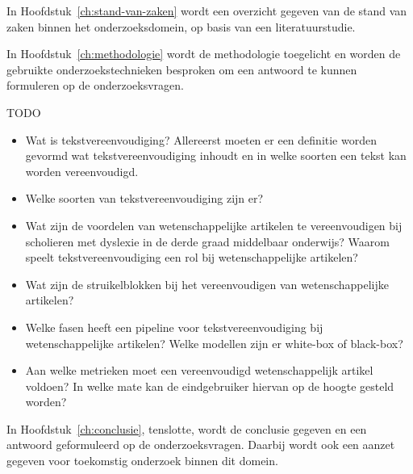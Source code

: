 In Hoofdstuk~\ref{ch:stand-van-zaken} wordt een overzicht gegeven van de stand van zaken binnen het onderzoeksdomein, op basis van een literatuurstudie.

In Hoofdstuk~\ref{ch:methodologie} wordt de methodologie toegelicht en worden de gebruikte onderzoekstechnieken besproken om een antwoord te kunnen formuleren op de onderzoeksvragen.


TODO
\begin{itemize}
	\item Wat is tekstvereenvoudiging? Allereerst moeten er een definitie worden gevormd wat tekstvereenvoudiging inhoudt en in welke soorten een tekst kan worden vereenvoudigd. 
	\item Welke soorten van tekstvereenvoudiging zijn er?
	\item Wat zijn de voordelen van wetenschappelijke artikelen te vereenvoudigen bij scholieren met dyslexie in de derde graad middelbaar onderwijs? Waarom speelt tekstvereenvoudiging een rol bij wetenschappelijke artikelen?
	\item Wat zijn de struikelblokken bij het vereenvoudigen van wetenschappelijke artikelen?
	\item Welke fasen heeft een pipeline voor tekstvereenvoudiging bij wetenschappelijke artikelen? Welke modellen zijn er white-box of black-box?
	\item Aan welke metrieken moet een vereenvoudigd wetenschappelijk artikel voldoen? In welke mate kan de eindgebruiker hiervan op de hoogte gesteld worden? 
\end{itemize}

In Hoofdstuk~\ref{ch:conclusie}, tenslotte, wordt de conclusie gegeven en een antwoord geformuleerd op de onderzoeksvragen. Daarbij wordt ook een aanzet gegeven voor toekomstig onderzoek binnen dit domein.